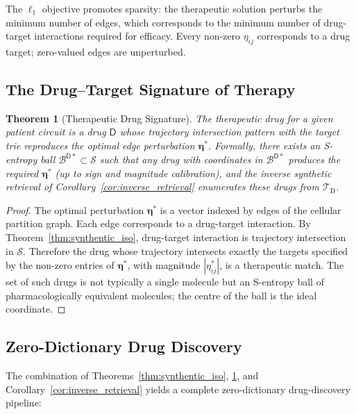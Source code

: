\documentclass[11pt,twocolumn,a4paper]{article}
\newtheorem{theorem}{Theorem}[section]
\theoremstyle{definition}
\theoremstyle{remark}
\newcommand{\Sspace}{\mathcal{S}}
\newcommand{\Trie}{\mathcal{T}}
\newcommand{\Dtrie}{\Trie_{\mathrm{D}}}
\newcommand{\Drug}{\mathsf{D}}
\begin{document}
The $\ell_1$ objective promotes sparsity: the therapeutic solution perturbs the minimum number of edges, which corresponds to the minimum number of drug-target interactions required for efficacy. Every non-zero $\eta_{ij}$ corresponds to a drug target; zero-valued edges are unperturbed.

\subsection{The Drug--Target Signature of Therapy}

\begin{theorem}[Therapeutic Drug Signature]
\label{thm:therapy_sig}
The therapeutic drug for a given patient circuit is a drug $\Drug$ whose trajectory intersection pattern with the target trie reproduces the optimal edge perturbation $\boldsymbol{\eta}^*$. Formally, there exists an S-entropy ball $\mathcal{B}^{\Drug*} \subset \Sspace$ such that any drug with coordinates in $\mathcal{B}^{\Drug*}$ produces the required $\boldsymbol{\eta}^*$ (up to sign and magnitude calibration), and the inverse synthetic retrieval of Corollary~\ref{cor:inverse_retrieval} enumerates these drugs from $\Dtrie$.
\end{theorem}

\begin{proof}
The optimal perturbation $\boldsymbol{\eta}^*$ is a vector indexed by edges of the cellular partition graph. Each edge corresponds to a drug-target interaction. By Theorem~\ref{thm:synthentic_iso}, drug-target interaction is trajectory intersection in $\Sspace$. Therefore the drug whose trajectory intersects exactly the targets specified by the non-zero entries of $\boldsymbol{\eta}^*$, with magnitude $|\eta^*_{ij}|$, is a therapeutic match. The set of such drugs is not typically a single molecule but an S-entropy ball of pharmacologically equivalent molecules; the centre of the ball is the ideal coordinate.
\end{proof}

\subsection{Zero-Dictionary Drug Discovery}

The combination of Theorems~\ref{thm:synthentic_iso}, \ref{thm:therapy_sig}, and Corollary~\ref{cor:inverse_retrieval} yields a complete zero-dictionary drug-discovery pipeline:
\end{document}
